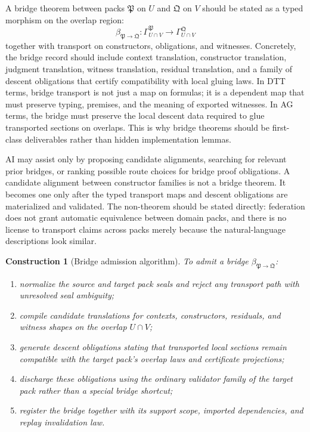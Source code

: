 \documentclass[11pt]{report}
\newtheorem{construction}[definition]{Construction}
\begin{document}
A bridge theorem between packs $\mathfrak{P}$ on $U$ and $\mathfrak{Q}$ on $V$ should be stated as a typed morphism on the overlap region:
\[
\beta_{\mathfrak{P}\to\mathfrak{Q}} :
\Gamma^{\mathfrak{P}}_{U\cap V}
\to
\Gamma^{\mathfrak{Q}}_{U\cap V}
\]
together with transport on constructors, obligations, and witnesses. Concretely, the bridge record should include context translation, constructor translation, judgment translation, witness translation, residual translation, and a family of descent obligations that certify compatibility with local gluing laws. In DTT terms, bridge transport is not just a map on formulas; it is a dependent map that must preserve typing, premises, and the meaning of exported witnesses. In AG terms, the bridge must preserve the local descent data required to glue transported sections on overlaps. This is why bridge theorems should be first-class deliverables rather than hidden implementation lemmas.

AI may assist only by proposing candidate alignments, searching for relevant prior bridges, or ranking possible route choices for bridge proof obligations. A candidate alignment between constructor families is not a bridge theorem. It becomes one only after the typed transport maps and descent obligations are materialized and validated. The non-theorem should be stated directly: federation does not grant automatic equivalence between domain packs, and there is no license to transport claims across packs merely because the natural-language descriptions look similar.

\begin{construction}[Bridge admission algorithm]
To admit a bridge $\beta_{\mathfrak{P}\to\mathfrak{Q}}$:
\begin{enumerate}
\item normalize the source and target pack seals and reject any transport path with unresolved seal ambiguity;
\item compile candidate translations for contexts, constructors, residuals, and witness shapes on the overlap $U \cap V$;
\item generate descent obligations stating that transported local sections remain compatible with the target pack's overlap laws and certificate projections;
\item discharge these obligations using the ordinary validator family of the target pack rather than a special bridge shortcut;
\item register the bridge together with its support scope, imported dependencies, and replay invalidation law.
\end{enumerate}
\end{construction}
\end{document}
